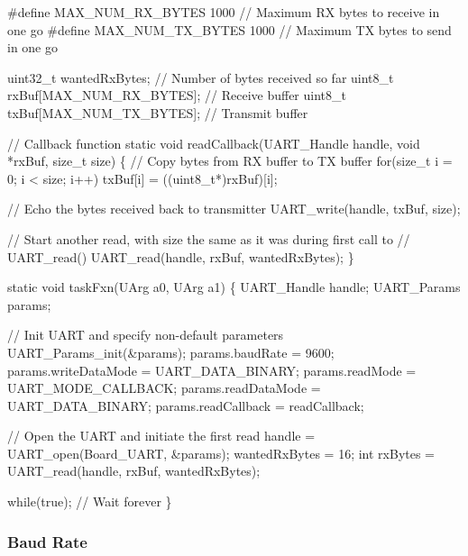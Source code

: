 \begin{DoxyCode}
\textcolor{preprocessor}{#define MAX\_NUM\_RX\_BYTES    1000   // Maximum RX bytes to receive in one go}
\textcolor{preprocessor}{#define MAX\_NUM\_TX\_BYTES    1000   // Maximum TX bytes to send in one go}

uint32\_t wantedRxBytes;            \textcolor{comment}{// Number of bytes received so far}
uint8\_t rxBuf[MAX\_NUM\_RX\_BYTES];   \textcolor{comment}{// Receive buffer}
uint8\_t txBuf[MAX\_NUM\_TX\_BYTES];   \textcolor{comment}{// Transmit buffer}

\textcolor{comment}{// Callback function}
\textcolor{keyword}{static} \textcolor{keywordtype}{void} readCallback(UART_Handle handle, \textcolor{keywordtype}{void} *rxBuf, \textcolor{keywordtype}{size\_t} size)
\{
    \textcolor{comment}{// Copy bytes from RX buffer to TX buffer}
    \textcolor{keywordflow}{for}(\textcolor{keywordtype}{size\_t} i = 0; i < size; i++)
        txBuf[i] = ((uint8\_t*)rxBuf)[i];

    \textcolor{comment}{// Echo the bytes received back to transmitter}
    UART_write(handle, txBuf, size);

    \textcolor{comment}{// Start another read, with size the same as it was during first call to}
    \textcolor{comment}{// UART\_read()}
    UART_read(handle, rxBuf, wantedRxBytes);
\}

\textcolor{keyword}{static} \textcolor{keywordtype}{void} taskFxn(UArg a0, UArg a1)
\{
    UART_Handle handle;
    UART_Params params;

    \textcolor{comment}{// Init UART and specify non-default parameters}
    UART_Params_init(&params);
    params.baudRate      = 9600;
    params.writeDataMode = UART_DATA_BINARY;
    params.readMode      = UART_MODE_CALLBACK;
    params.readDataMode  = UART_DATA_BINARY;
    params.readCallback  = readCallback;

    \textcolor{comment}{// Open the UART and initiate the first read}
    handle = UART_open(Board\_UART, &params);
    wantedRxBytes = 16;
    \textcolor{keywordtype}{int} rxBytes = UART_read(handle, rxBuf, wantedRxBytes);

    \textcolor{keywordflow}{while}(\textcolor{keyword}{true}); \textcolor{comment}{// Wait forever}
\}
\end{DoxyCode}


\subsubsection*{Baud Rate}

